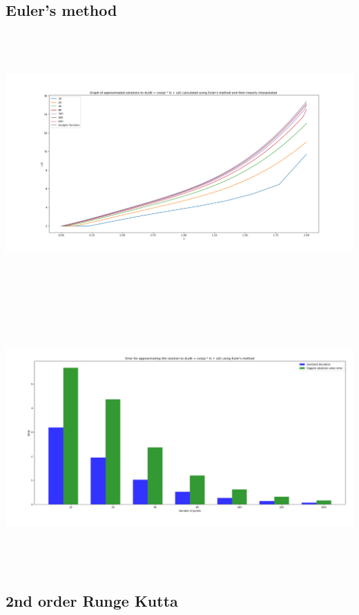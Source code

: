 \documentclass[10pt]{article}
\begin{document}
\subsection{Euler's method}
\label{sec:org1651bc7}
\begin{center}
\includegraphics[angle=0,height=10cm]{./img/euler_function.png}
\end{center}

\begin{center}
\includegraphics[angle=0,height=10cm]{./img/euler_error.png}
\end{center}


\subsection{2nd order Runge Kutta}
\label{sec:orgde5ffa8}
\end{document}
